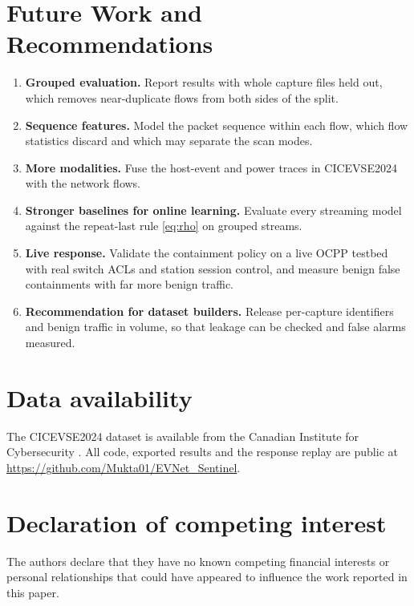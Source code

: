 \documentclass[preprint,12pt]{elsarticle}
\begin{document}
\section{Future Work and Recommendations}

\begin{enumerate}
    \item \textbf{Grouped evaluation.} Report results with whole capture files held out, which removes near-duplicate flows from both sides of the split.
    \item \textbf{Sequence features.} Model the packet sequence within each flow, which flow statistics discard and which may separate the scan modes.
    \item \textbf{More modalities.} Fuse the host-event and power traces in CICEVSE2024 with the network flows.
    \item \textbf{Stronger baselines for online learning.} Evaluate every streaming model against the repeat-last rule \eqref{eq:rho} on grouped streams.
    \item \textbf{Live response.} Validate the containment policy on a live OCPP testbed with real switch ACLs and station session control, and measure benign false containments with far more benign traffic.
    \item \textbf{Recommendation for dataset builders.} Release per-capture identifiers and benign traffic in volume, so that leakage can be checked and false alarms measured.
\end{enumerate}

\section*{Data availability}

The CICEVSE2024 dataset is available from the Canadian Institute for Cybersecurity \cite{b8}. All code, exported results and the response replay are public at \url{https://github.com/Mukta01/EVNet_Sentinel}.

\section*{Declaration of competing interest}

The authors declare that they have no known competing financial interests or personal relationships that could have appeared to influence the work reported in this paper.
\end{document}
